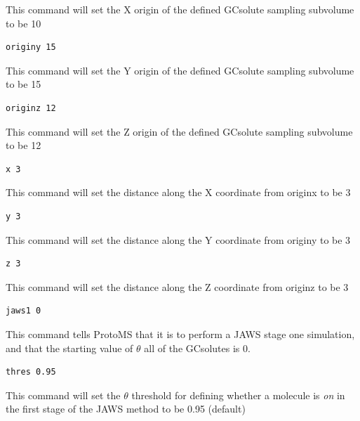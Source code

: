 \documentclass[letterpaper,10pt,english]{sphinxmanual}
\begin{document}
This command will set the X origin of the defined GCsolute sampling subvolume to be 10

\begin{Verbatim}[commandchars=\\\{\}]
originy 15
\end{Verbatim}

This command will set the Y origin of the defined GCsolute sampling subvolume to be 15

\begin{Verbatim}[commandchars=\\\{\}]
originz 12
\end{Verbatim}

This command will set the Z origin of the defined GCsolute sampling subvolume to be 12

\begin{Verbatim}[commandchars=\\\{\}]
x 3
\end{Verbatim}

This command will set the distance along the X coordinate from originx to be 3

\begin{Verbatim}[commandchars=\\\{\}]
y 3
\end{Verbatim}

This command will set the distance along the Y coordinate from originy to be 3

\begin{Verbatim}[commandchars=\\\{\}]
z 3
\end{Verbatim}

This command will set the distance along the Z coordinate from originz to be 3

\begin{Verbatim}[commandchars=\\\{\}]
jaws1 0
\end{Verbatim}

This command tells ProtoMS that it is to perform a JAWS stage one simulation, and that the starting value of \(\theta\) all of the GCsolutes is 0.

\begin{Verbatim}[commandchars=\\\{\}]
thres 0.95
\end{Verbatim}

This command will set the \(\theta\) threshold for defining whether a molecule is \emph{on} in the first stage of the JAWS method to be 0.95 (default)
\end{document}
